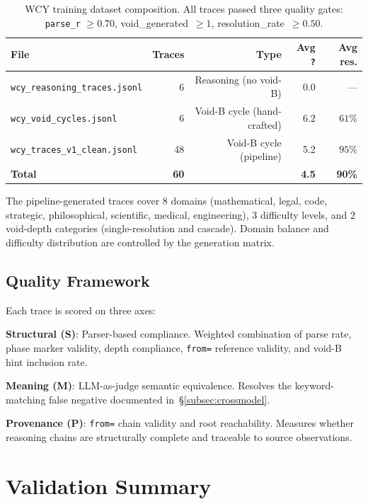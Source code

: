 \documentclass[11pt,a4paper]{article}
\begin{document}
\begin{table}[H]
\centering
\small
\begin{tabular}{@{}lrrrr@{}}
\toprule
\textbf{File} & \textbf{Traces} & \textbf{Type} & \textbf{Avg \texttt{?}} & \textbf{Avg res.} \\
\midrule
\texttt{wcy\_reasoning\_traces.jsonl} & 6  & Reasoning (no void-B)       & 0.0 & --- \\
\texttt{wcy\_void\_cycles.jsonl}       & 6  & Void-B cycle (hand-crafted) & 6.2 & $61\%$ \\
\texttt{wcy\_traces\_v1\_clean.jsonl}  & 48 & Void-B cycle (pipeline)     & 5.2 & $95\%$ \\
\midrule
\textbf{Total} & \textbf{60} & & \textbf{4.5} & \textbf{90\%}\\
\bottomrule
\end{tabular}
\caption{WCY training dataset composition. All traces passed three quality gates: \texttt{parse\_r} $\geq 0.70$, void\_generated~$\geq 1$, resolution\_rate~$\geq 0.50$.}
\label{tab:dataset}
\end{table}

The pipeline-generated traces cover 8 domains (mathematical, legal, code, strategic, philosophical, scientific, medical, engineering), 3 difficulty levels, and 2 void-depth categories (single-resolution and cascade). Domain balance and difficulty distribution are controlled by the generation matrix.

\subsection{Quality Framework}

Each trace is scored on three axes:

\textbf{Structural (S)}: Parser-based compliance. Weighted combination of parse rate, phase marker validity, depth compliance, \texttt{from=} reference validity, and void-B hint inclusion rate.

\textbf{Meaning (M)}: LLM-as-judge semantic equivalence. Resolves the keyword-matching false negative documented in~\S\ref{subsec:crossmodel}.

\textbf{Provenance (P)}: \texttt{from=} chain validity and root reachability. Measures whether reasoning chains are structurally complete and traceable to source observations.

\section{Validation Summary}
\label{sec:validation}
\end{document}
